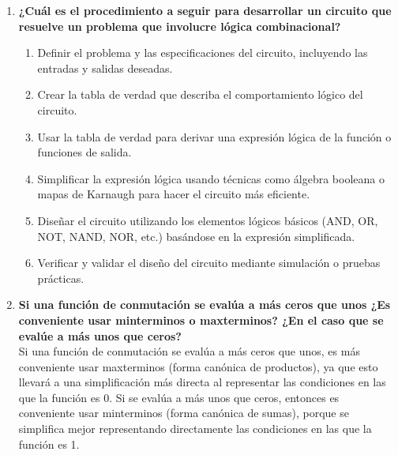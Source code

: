 \documentclass{article}
\begin{document}
\begin{enumerate}
    \item \textbf{¿Cuál es el procedimiento a seguir para desarrollar un circuito que resuelve un problema que involucre lógica combinacional?}
    \begin{enumerate}
        \item Definir el problema y las especificaciones del circuito, incluyendo las entradas y salidas deseadas.
        \item Crear la tabla de verdad que describa el comportamiento lógico del circuito.
        \item Usar la tabla de verdad para derivar una expresión lógica de la función o funciones de salida.
        \item Simplificar la expresión lógica usando técnicas como álgebra booleana o mapas de Karnaugh para hacer el circuito más eficiente.
        \item Diseñar el circuito utilizando los elementos lógicos básicos (AND, OR, NOT, NAND, NOR, etc.) basándose en la expresión simplificada.
        \item Verificar y validar el diseño del circuito mediante simulación o pruebas prácticas.
    \end{enumerate}

    \item \textbf{Si una función de conmutación se evalúa a más ceros que unos ¿Es conveniente usar minterminos o maxterminos? ¿En el caso que se evalúe a más unos que ceros?} \\
    Si una función de conmutación se evalúa a más ceros que unos, es más conveniente usar maxterminos (forma canónica de productos), ya que esto llevará a una simplificación más directa al representar las condiciones en las que la función es 0.
    Si se evalúa a más unos que ceros, entonces es conveniente usar minterminos (forma canónica de sumas), porque se simplifica mejor representando directamente las condiciones en las que la función es 1.


\end{enumerate}
\end{document}

